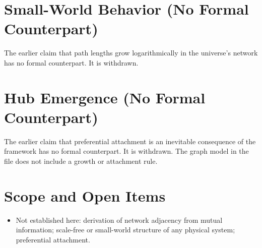 \documentclass[11pt, a4paper]{article}
\begin{document}
\section{Small-World Behavior (No Formal Counterpart)}
The earlier claim that path lengths grow logarithmically in the universe's network has no formal counterpart. It is withdrawn.

\section{Hub Emergence (No Formal Counterpart)}
The earlier claim that preferential attachment is an inevitable consequence of the framework has no formal counterpart. It is withdrawn. The graph model in the file does not include a growth or attachment rule.

\section{Scope and Open Items}
\begin{itemize}
  \item Not established here: derivation of network adjacency from mutual information; scale-free or small-world structure of any physical system; preferential attachment.
\end{itemize}
\end{document}
